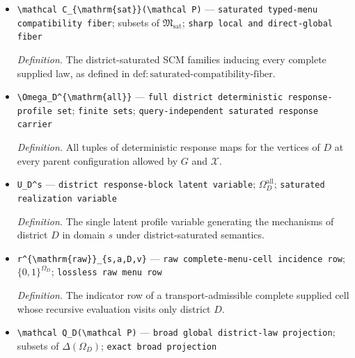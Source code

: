 \documentclass{article}
\begin{document}
\begin{itemize}
  \par\smallskip\noindent\emph{Definition.} The response-block subclass of \(\mathfrak M\) defined in \(\mathrm{def:district\text{-}saturated\text{-}model\text{-}class}\).
  \item \texttt{\textbackslash{}\allowbreak{}mathcal C\_\allowbreak{}\{\textbackslash{}\allowbreak{}mathrm\{sat\}\allowbreak{}\}\allowbreak{}(\textbackslash{}\allowbreak{}mathcal P)} --- \texttt{saturated typed-\allowbreak{}menu compatibility fiber}; subsets of \(\mathfrak M_{\mathrm{sat}}\); \texttt{sharp local and direct-\allowbreak{}global fiber}
  \par\smallskip\noindent\emph{Definition.} The district-saturated SCM families inducing every complete supplied law, as defined in \(\mathrm{def:saturated\text{-}compatibility\text{-}fiber}\).
  \item \texttt{\textbackslash{}\allowbreak{}Omega\_\allowbreak{}D\textasciicircum{}\{\textbackslash{}\allowbreak{}mathrm\{all\}\allowbreak{}\}\allowbreak{}} --- \texttt{full district deterministic response-\allowbreak{}profile set}; \texttt{finite sets}; \texttt{query-\allowbreak{}independent saturated response carrier}
  \par\smallskip\noindent\emph{Definition.} All tuples of deterministic response maps for the vertices of \(D\) at every parent configuration allowed by \(G\) and \(\mathcal X\).
  \item \texttt{U\_\allowbreak{}D\textasciicircum{}s} --- \texttt{district response-\allowbreak{}block latent variable}; \(\Omega_D^{\mathrm{all}}\); \texttt{saturated realization variable}
  \par\smallskip\noindent\emph{Definition.} The single latent profile variable generating the mechanisms of district \(D\) in domain \(s\) under district-saturated semantics.
  \item \texttt{r\textasciicircum{}\{\textbackslash{}\allowbreak{}mathrm\{raw\}\allowbreak{}\}\allowbreak{}\_\allowbreak{}\{s,\allowbreak{}a,\allowbreak{}D,\allowbreak{}v\}\allowbreak{}} --- \texttt{raw complete-\allowbreak{}menu-\allowbreak{}cell incidence row}; \(\{0,1\}^{\Omega_D}\); \texttt{lossless raw menu row}
  \par\smallskip\noindent\emph{Definition.} The indicator row of a transport-admissible complete supplied cell whose recursive evaluation visits only district \(D\).
  \item \texttt{\textbackslash{}\allowbreak{}mathcal Q\_\allowbreak{}D(\textbackslash{}\allowbreak{}mathcal P)} --- \texttt{broad global district-\allowbreak{}law projection}; subsets of \(\Delta(\Omega_D)\); \texttt{exact broad projection}

\end{itemize}
\end{document}

